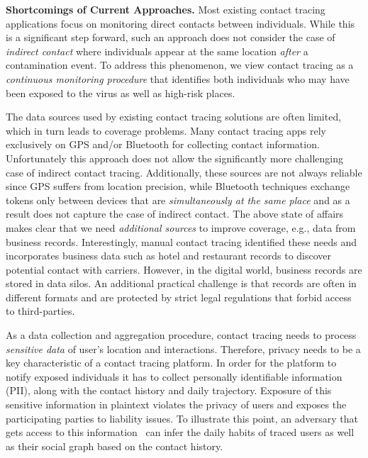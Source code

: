 \documentclass[11pt]{article}  %
\begin{document}
\textbf{Shortcomings of Current Approaches.} Most existing contact tracing applications focus on monitoring direct contacts between individuals. 
While this is a significant step forward, such an  approach does not consider the case of \emph{indirect contact} where individuals appear at the same location \emph{after} a contamination event. To address this phenomenon, we view contact tracing as a \emph{continuous monitoring procedure} that identifies both individuals who may have been exposed to the virus as well as high-risk places. %

 The data sources used by existing contact tracing solutions are often limited, which in turn leads to coverage problems. Many contact tracing apps rely exclusively on GPS and/or Bluetooth for collecting contact information. Unfortunately this approach does not allow the significantly more challenging case of indirect contact tracing. Additionally, these sources are not always reliable since GPS suffers from location precision, while Bluetooth techniques exchange tokens only between devices that are \emph{simultaneously at the same place} and as a result does not capture the case of indirect contact. The above state of affairs makes clear that we need \emph{additional sources} to improve coverage, e.g., data from business records. Interestingly, manual contact tracing identified these needs and incorporates business data such as hotel and restaurant records to discover potential contact with carriers. However, in the digital world, business records are stored in data silos. An additional practical challenge is that records are often in different formats and are protected by strict legal regulations that forbid access to third-parties.

As a data collection and aggregation procedure, contact tracing needs to process \emph{sensitive data} of user's location and interactions. 
Therefore, privacy needs to be a key characteristic of a contact tracing platform. 
In order for the platform to notify exposed individuals it has to collect personally identifiable information (PII), along with the contact history and daily trajectory.  Exposure of this sensitive information in plaintext violates the privacy of users and exposes the participating parties to liability issues. To illustrate this point, an adversary that gets access to this information~\cite{corona-sniffer} can infer the daily habits of traced users as well as their social graph based on the contact history. 
\end{document}

